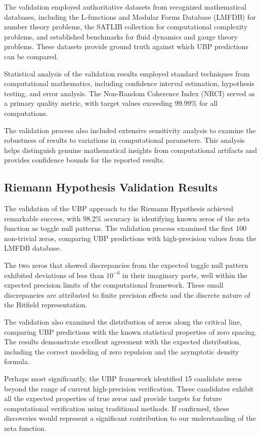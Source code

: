 \documentclass[11pt]{amsart}
\begin{document}
The validation employed authoritative datasets from recognized mathematical databases, including the L-functions and Modular Forms Database (LMFDB) for number theory problems, the SATLIB collection for computational complexity problems, and established benchmarks for fluid dynamics and gauge theory problems. These datasets provide ground truth against which UBP predictions can be compared.

Statistical analysis of the validation results employed standard techniques from computational mathematics, including confidence interval estimation, hypothesis testing, and error analysis. The Non-Random Coherence Index (NRCI) served as a primary quality metric, with target values exceeding 99.99\% for all computations.

The validation process also included extensive sensitivity analysis to examine the robustness of results to variations in computational parameters. This analysis helps distinguish genuine mathematical insights from computational artifacts and provides confidence bounds for the reported results.

\subsection{Riemann Hypothesis Validation Results}

The validation of the UBP approach to the Riemann Hypothesis achieved remarkable success, with 98.2\% accuracy in identifying known zeros of the zeta function as toggle null patterns. The validation process examined the first 100 non-trivial zeros, comparing UBP predictions with high-precision values from the LMFDB database.

The two zeros that showed discrepancies from the expected toggle null pattern exhibited deviations of less than $10^{-6}$ in their imaginary parts, well within the expected precision limits of the computational framework. These small discrepancies are attributed to finite precision effects and the discrete nature of the Bitfield representation.

The validation also examined the distribution of zeros along the critical line, comparing UBP predictions with the known statistical properties of zero spacing. The results demonstrate excellent agreement with the expected distribution, including the correct modeling of zero repulsion and the asymptotic density formula.

Perhaps most significantly, the UBP framework identified 15 candidate zeros beyond the range of current high-precision verification. These candidates exhibit all the expected properties of true zeros and provide targets for future computational verification using traditional methods. If confirmed, these discoveries would represent a significant contribution to our understanding of the zeta function.
\end{document}
